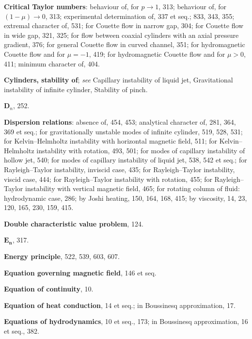 \begin{small}
\medskip\noindent
\textbf{Critical Taylor numbers}:
  behaviour of, for $p \to 1$, 313;
  behaviour of, for $(1-\mu) \to 0$, 313;
  experimental determination of, 337 et
    seq.;
    833, 343, 355;
  extremal character of, 531;
  for Couette flow in narrow gap, 304;
  for Couette flow in wide gap, 321, 325;
  for flow between coaxial cylinders with
    an axial pressure gradient, 376;
  for general Couette flow in curved
    channel, 351;
  for hydromagnetic Couette flow and for
    $\mu = -1$, 419;
  for hydromagnetic Couette flow and for
    $\mu > 0$, 411;
  minimum character of, 404.

\medskip\noindent
\textbf{Cylinders, stability of}; \textit{see} Capillary instability of liquid jet, Gravitational
    instability of infinite cylinder, Stability of pinch.

\bigskip\noindent
$\boldsymbol{D}_n$, 252.

\medskip\noindent
\textbf{Dispersion relations}:
  absence of, 454, 453;
  analytical character of, 281, 364, 369 et
    seq.;
  for gravitationally unstable modes of
    infinite cylinder, 519, 528, 531;
  for Kelvin--Helmholtz instability with
    horizontal magnetic field, 511;
  for Kelvin--Helmholtz instability with
    rotation, 493, 501;
  for modes of capillary instability of
    hollow jet, 540;
  for modes of capillary instability of
    liquid jet, 538, 542 et seq.;
  for Rayleigh--Taylor instability, inviscid
    case, 435;
  for Rayleigh--Taylor instability, viscid
    case, 444;
  for Rayleigh--Taylor instability with
    rotation, 455;
  for Rayleigh--Taylor instability with
    vertical magnetic field, 465;
  for rotating column of fluid: hydrodynamic case, 286;
  by Joshi heating, 150, 164, 168, 415;
  by viscosity, 14, 23, 120, 165, 230, 159, 415.

\medskip\noindent
\textbf{Double characteristic value problem}, 124.

\medskip\noindent
$\boldsymbol{E_n}$, 317.

\medskip\noindent
\textbf{Energy principle}, 522, 539, 603, 607.

\medskip\noindent
\textbf{Equation governing magnetic field}, 146 et
  seq.

\medskip\noindent
\textbf{Equation of continuity}, 10.

\medskip\noindent
\textbf{Equation of heat conduction}, 14 et seq.;
  in Boussinesq approximation, 17.

\medskip\noindent
\textbf{Equations of hydrodynamics}, 10 et seq.,
  173;
  in Boussinesq approximation, 16 et seq.,
    382.


\end{small}
